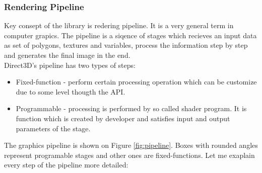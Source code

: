 \documentclass[twoside, english, 11pt]{report}
\begin{document}
\subsubsection{Rendering Pipeline}
Key consept of the library is redering pipeline. It is a very general term in computer grapics. The pipeline is a siqence of stages which recieves an input data as set of polygons, textures and variables, process the information step by step and generates the final image in the end.\\

Direct3D's pipeline has two types of steps:
\begin{itemize}
\item Fixed-function - perform certain processing operation which can be customize due to some level thougth the API.
\item Programmable - processing is performed by so called shader program. It is function which is created by developer and satisfies input and output parameters of the stage.
\end{itemize}

The graphics pipeline is shown on Figure \ref{fig:pipeline}. Boxes with rounded angles represent programable stages and other ones are fixed-functions. Let me exaplain every step of the pipeline more detailed: 
\end{document}
